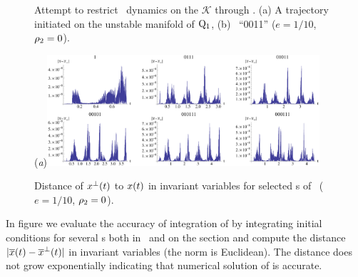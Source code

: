 {\begin{figure}[ht]
\begin{center}
\end{center}
\caption[\CLe\ desymmetrization with transverse integration]{
Attempt to restrict \CLe\ dynamics on the {\slice} $\mathcal{K}$ through
. (a) A trajectory initiated on the unstable
manifold of $\mathrm{Q}_{1}$, (b) \rpo\ ``0011''
($e=1/10$, $\rho_2=0$).
    }
\label{fig:CLEtransv}
\end{figure}

\begin{figure}[ht]
\begin{center}
  (\textit{a})\includegraphics[width=0.9\textwidth, clip=true]{../figs/CLEerrTransv}
\end{center}
\caption[Numerical error in \CLe\ desymmetrization with transverse integration]{
Distance of $x^\perp(t)$ to $x(t)$ in invariant variables
for selected \rpo s of \CLe\,
($e=1/10$, $\rho_2=0$).
    }
\label{fig:CLEerrTransv}
\end{figure}

In figure  we evaluate the accuracy
of integration of  by integrating
initial conditions for several \rpo s both in \statesp\ and
on the section and compute the distance
$|\overline{x}(t)-\overline{x}^\perp(t)|$ in invariant
variables  (the norm is Euclidean). The
distance does not grow exponentially indicating that
numerical solution of  is accurate.

}
